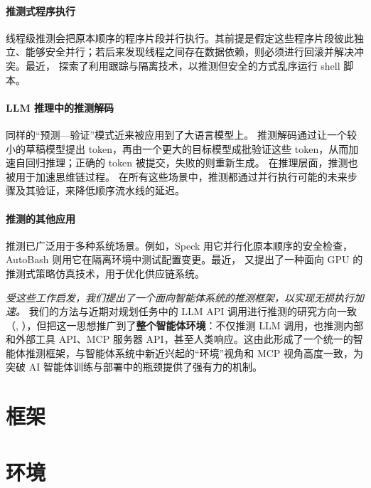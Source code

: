\documentclass{article} %
\theoremstyle{plain}
\theoremstyle{definition}
\theoremstyle{remark}
\begin{document}
\paragraph{推测式程序执行}
线程级推测会把原本顺序的程序片段并行执行。其前提是假定这些程序片段彼此独立、能够安全并行；若后来发现线程之间存在数据依赖，则必须进行回滚并解决冲突\citep{10.1145/2938369}。最近，\citep{liargkovas2023shell} 探索了利用跟踪与隔离技术，以推测但安全的方式乱序运行 shell 脚本。

\paragraph{LLM 推理中的推测解码}
同样的“预测—验证”模式近来被应用到了大语言模型上。
推测解码通过让一个较小的草稿模型提出 token，再由一个更大的目标模型成批验证这些 token，从而加速自回归推理；正确的 token 被提交，失败的则重新生成\citep{leviathan2023fast,zhang2024beyond,chen2023acceleratinglargelanguagemodel}。
在推理层面，推测也被用于加速思维链过程\citep{wang2025acceleratinglargelanguagemodel,wang2025efficientreasoningllmsspeculative,fu2025scaling}。
在所有这些场景中，推测都通过并行执行可能的未来步骤及其验证，来降低顺序流水线的延迟。

\paragraph{推测的其他应用}
推测已广泛用于多种系统场景。例如，Speck\citep{nightingale2008parallelizing} 用它并行化原本顺序的安全检查，AutoBash\citep{su2007autobash} 则用它在隔离环境中测试配置变更。最近，\cite{farias2024speeding} 又提出了一种面向 GPU 的推测式策略仿真技术，用于优化供应链系统。

\textit{受这些工作启发，我们提出了一个面向智能体系统的推测框架，以实现无损执行加速。} 我们的方法与近期对规划任务中的 LLM API 调用进行推测的研究方向一致（\cite{hua2024interactivespeculativeplanningenhance}, \cite{guan2025dynamicspeculativeagentplanning}），但把这一思想推广到了\textbf{整个智能体环境}：不仅推测 LLM 调用，也推测内部和外部工具 API、MCP 服务器 API，甚至人类响应。这由此形成了一个统一的智能体推测框架，与智能体系统中新近兴起的“环境”视角和 MCP 视角高度一致，为突破 AI 智能体训练与部署中的瓶颈提供了强有力的机制。

\section{框架}
\label{framework}


\section{环境}
\end{document}
